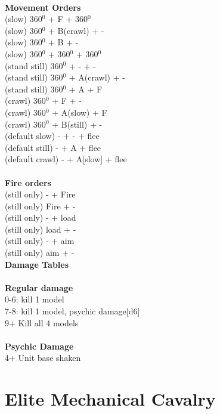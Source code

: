\ \\ {\bf Movement Orders } \\
(slow) 360$^0$ + F + 360$^0$ \\
(slow) 360$^0$ + B(crawl) + - \\
(slow) 360$^0$ + B + - \\
(slow) 360$^0$ + 360$^0$ + 360$^0$ \\
(stand still) 360$^0$ + - + -  \\
(stand still) 360$^0$ + A(crawl) + - \\
(stand still) 360$^0$ + A + F \\
(crawl) 360$^0$ + F + - \\
(crawl) 360$^0$ + A(slow) + F \\
(crawl) 360$^0$ + B(still) + - \\
(default slow) - + - + flee \\
(default still) - + A + flee \\
(default crawl) - + A[slow] + flee \\
\ \\ {\bf Fire orders } \\
(still only) - + Fire \\
(still only) Fire + -  \\
(still only) - + load \\
(still only) load + - \\
(still only) - + aim \\
(still only) aim + -  \\



{\bf Damage Tables} \\
\ \\ {\bf Regular damage } \\
0-6: kill 1 model \\
7-8: kill 1 model, psychic damage[d6] \\
9+ Kill all 4 models \\
\ \\ {\bf Psychic Damage } \\
4+ Unit base shaken \\









\pagebreak

\section{ Elite Mechanical Cavalry }

